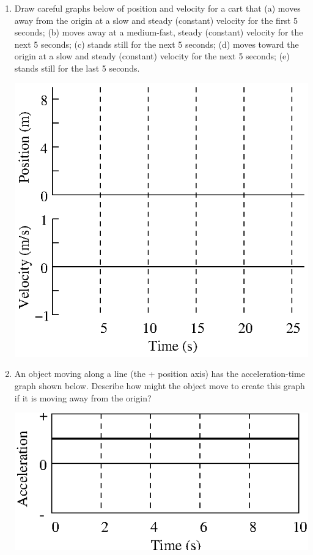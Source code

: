 \begin{enumerate}
\newpage

\item Draw careful graphs below of position and velocity for a cart that (a) moves
away from the origin at a slow and steady (constant) velocity for the first
5 seconds; (b) moves away at a medium-fast, steady (constant) velocity for the
next 5 seconds; (c) stands still for the next 5 seconds; (d) moves toward the
origin at a slow and steady (constant) velocity for the next 5 seconds; (e)
stands still for the last 5 seconds.

\vspace{0.3cm}
{\par\centering \includegraphics{iqsRelatingMotion/relating_fig6.eps} \par}
\vspace{0.3cm}


\item An object moving along a line (the + position axis) has the acceleration-time
graph shown below. Describe how might the object move to create this graph if
it is moving away from the origin?

\vspace{0.3cm}
{\par\raggedright \includegraphics{iqsRelatingMotion/changing_fig6.eps} \par}
\vspace{1.3cm}


\end{enumerate}
